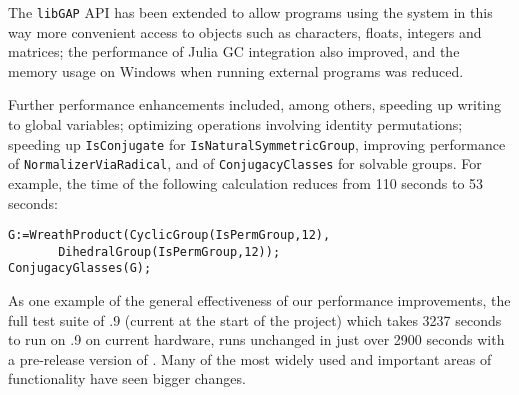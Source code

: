 The \texttt{libGAP} API has been extended
to allow programs using the system in this way
more convenient access to \GAP objects such as
characters, floats, integers
and matrices; 
the performance of Julia GC integration also improved,
and the memory usage on Windows when running external programs was reduced.

Further performance enhancements included, among others,
speeding up writing to global variables;
optimizing operations involving identity permutations;
speeding up \verb|IsConjugate| for \verb|IsNaturalSymmetricGroup|,
improving performance of \verb|NormalizerViaRadical|,
and of \verb|ConjugacyClasses| for solvable groups. For example, the time
of the following calculation reduces from 110 seconds to 53 seconds:

{\Small
\begin{verbatim}
G:=WreathProduct(CyclicGroup(IsPermGroup,12),
       DihedralGroup(IsPermGroup,12));
ConjugacyGlasses(G);
\end{verbatim}
}
\noindent

%
%
%



As one example of the general effectiveness of our performance
improvements, the full test suite of .9 (current at the
start of the project) which takes 3237 seconds to run on .9 on
current hardware, runs unchanged in just over 2900 seconds with a
pre-release version of . Many of the most widely used and
important areas of \GAP functionality have seen bigger changes.  

